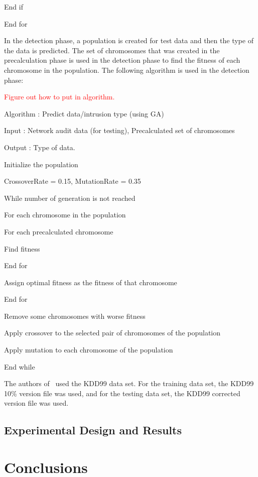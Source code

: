 \documentclass{sig-alternate}
\newcommand{\mycomment}[1]{\textcolor{red}{#1}}
\begin{document}
   End if

End for 


In the detection phase, a population is created for test data and then the type of the data is predicted. The set of chromosomes that was created in the precalculation phase is used in the detection phase to find the fitness of each chromosome in the population. The following algorithm is used in the detection phase:

\mycomment{Figure out how to put in algorithm.}

Algorithm : Predict data/intrusion type (using GA)

Input : Network audit data (for testing), Precalculated set of chromosomes

Output : Type of data.

Initialize the population

CrossoverRate = 0.15, MutationRate = 0.35

While number of generation is not reached
   
   For each chromosome in the population
      
      For each precalculated chromosome
         
         Find fitness
      
      End for

      Assign optimal fitness as the fitness of that chromosome
   
   End for
   
   Remove some chromosomes with worse fitness
   
   Apply crossover to the selected pair of chromosomes of the population

   Apply mutation to each chromosome of the population

End while 


The authors of~\cite{DBLP:journals/corr/abs-1204-1336} used the KDD99 data set. For the training data set, the KDD99 10\% version file was used, and for the testing data set, the KDD99 corrected version file was used. 




\subsection{Experimental Design and Results}





\section{Conclusions}
\end{document}
